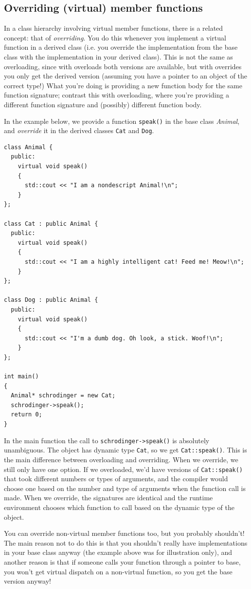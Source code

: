 \documentclass[a4paper]{scrartcl}
\begin{document}
\subsection{Overriding (virtual) member functions}
In a class hierarchy involving virtual member functions, there is a related concept: that of \emph{overriding}. You do this whenever you implement a virtual function in a derived class (i.e. you override the implementation from the base class with the implementation in your derived class). This is not the same as overloading, since with overloads both versions are available, but with overrides you only get the derived version (assuming you have a pointer to an object of the correct type!) What you're doing is providing a new function body for the same function signature; contrast this with overloading, where you're providing a different function signature and (possibly) different function body.

In the example below, we provide a function \verb|speak()| in the base class \emph{Animal}, and \emph{override} it in the derived classes \verb|Cat| and \verb|Dog|.
\begin{verbatim}
class Animal {
  public:
    virtual void speak()
    {
      std::cout << "I am a nondescript Animal!\n";
    }
};

class Cat : public Animal {
  public:
    virtual void speak()
    {
      std::cout << "I am a highly intelligent cat! Feed me! Meow!\n";
    }
};

class Dog : public Animal {
  public:
    virtual void speak()
    {
      std::cout << "I'm a dumb dog. Oh look, a stick. Woof!\n";
    }
};

int main()
{
  Animal* schrodinger = new Cat;
  schrodinger->speak();
  return 0;
}
\end{verbatim}

In the main function the call to \verb|schrodinger->speak()| is absolutely unambiguous. The object has dynamic type \verb|Cat|, so we get \verb|Cat::speak()|. This is the main difference between overloading and overriding. When we override, we still only have one option. If we overloaded, we'd have versions of \verb|Cat::speak()| that took different numbers or types of arguments, and the compiler would choose one based on the number and type of arguments when the function call is made. When we override, the signatures are identical and the runtime environment chooses which function to call based on the dynamic type of the object.

You can override non-virtual member functions too, but you probably shouldn't! The main reason not to do this is that you shouldn't really have implementations in your base class anyway (the example above was for illustration only), and another reason is that if someone calls your function through a pointer to base, you won't get virtual dispatch on a non-virtual function, so you get the base version anyway!
\end{document}
